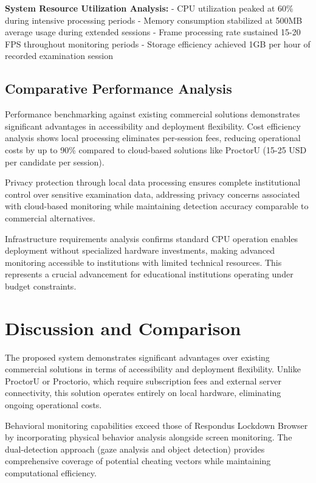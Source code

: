 \documentclass[conference]{IEEEtran}
\begin{document}
\textbf{System Resource Utilization Analysis:}
- CPU utilization peaked at 60\% during intensive processing periods
- Memory consumption stabilized at 500MB average usage during extended sessions\cite{harris2020array}
- Frame processing rate sustained 15-20 FPS throughout monitoring periods
- Storage efficiency achieved 1GB per hour of recorded examination session

\subsection{Comparative Performance Analysis}

Performance benchmarking against existing commercial solutions demonstrates significant advantages in accessibility and deployment flexibility\cite{proctoru}\cite{proctorio}\cite{respondus}. Cost efficiency analysis shows local processing eliminates per-session fees, reducing operational costs by up to 90\% compared to cloud-based solutions like ProctorU (15-25 USD per candidate per session).

Privacy protection through local data processing ensures complete institutional control over sensitive examination data, addressing privacy concerns associated with cloud-based monitoring while maintaining detection accuracy comparable to commercial alternatives.

Infrastructure requirements analysis confirms standard CPU operation enables deployment without specialized hardware investments, making advanced monitoring accessible to institutions with limited technical resources. This represents a crucial advancement for educational institutions operating under budget constraints\cite{pyqt5}.

\section{Discussion and Comparison}

The proposed system demonstrates significant advantages over existing commercial solutions in terms of accessibility and deployment flexibility. Unlike ProctorU or Proctorio, which require subscription fees and external server connectivity\cite{proctoru}\cite{proctorio}, this solution operates entirely on local hardware, eliminating ongoing operational costs.

Behavioral monitoring capabilities exceed those of Respondus Lockdown Browser by incorporating physical behavior analysis alongside screen monitoring\cite{respondus}. The dual-detection approach (gaze analysis and object detection) provides comprehensive coverage of potential cheating vectors while maintaining computational efficiency.
\end{document}
